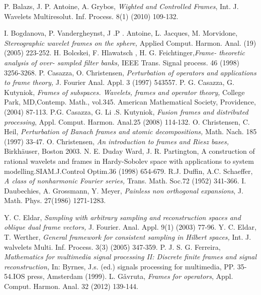 \documentclass[11pt]{amsart}
\theoremstyle{definition}
\theoremstyle{remark}
\numberwithin{equation}{section}
\begin{document}
\begin{thebibliography}{99}
  P. Balazs, J. P. Antoine, A. Grybos, {\it Wighted and Controlled Frames}, Int. J. Wavelets Multiresolut. Inf. Process. 8(1) (2010) 109-132.

 I. Bogdanova, P. Vandergheynst, J .P . Antoine, L. Jacques, M. Morvidone, {\it Stereographic wavelet frames on the sphere,}  Applied Comput. Harmon. Anal. (19) (2005) 223-252.
 H. Bolcskei, F. Hlawatsch , H. G. Feichtinger,{\it   Frame- theoretic analysis of over- sampled filter banks, } IEEE Trans. Signal process. 46 (1998)  3256-3268.
 P. Casazza, O. Christensen, {\it Perturbation of operators and applications to frame theory,} J. Fourier Anal. Appl. 3 (1997)
543557.
 P. G. Casazza, G. Kutyniok, {\it Frames of subspaces. Wavelets, frames and operator theory,} College Park, MD,Contemp. Math., vol.345. American Mathematical Society, Providence,(2004) 87-113.
 P.G. Casazza, G. Li .S. Kutyniok,  {\it Fusion frames and distributed processing}, Appl. Comput. Harmon. Anal.25 (2008) 114-132.
 O. Christensen, C. Heil, {\it Perturbation of Banach frames and atomic decompositions,} Math. Nach. 185 (1997) 33-47.
O. Christensen, {\it An introduction to frames and Riesz bases,}
Birkh\"{a}user, Boston 2003.
 N. E. Duday Ward, J. R. Partington, A construction of rational wavelets and frames in Hardy-Sobolev space with applications to system modelling.SIAM.J.Control Optim.36  (1998) 654-679.
  R.J. Duffin, A.C. Schaeffer, {\it A class of nonharmonic Fourier series,}  Trans. Math. Soc.72 (1952) 341-366.
   I. Daubechies, A. Grossmann, Y. Meyer,  {\it Painless non orthogonal expansions}, J. Math. Phys. 27(1986)  1271-1283.

Y. C. Eldar,  {\it Sampling with arbitrary sampling and reconstruction spaces and oblique dual frame vectors, } J. Fourier. Anal. Appl. 9(1) (2003)  77-96.
Y. C. Eldar, T. Werther,  {\it General framework for consistent sampling in Hilbert spaces,} Int. J. walvelets Multi. Inf. Process. 3(3) (2005) 347-359.
 P. J. S. G. Ferreira,  {\it Mathematics for multimedia signal processing II: Discrete finite frames and signal reconstruction,} In: Byrnes, J.s. (ed.) signals processing for multimedia, PP. 35-54.IOS press, Amsterdam (1999).
     L. G\v{a}vruta, {\it Frames for operators},  Appl. Comput. Harmon. Anal. 32 (2012)  139-144.


\end{thebibliography}
\end{document}
